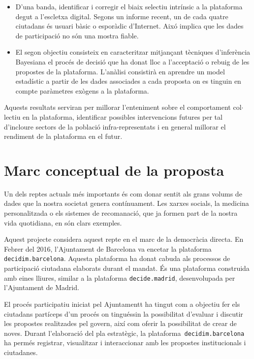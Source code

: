 \documentclass[final,10pt]{article}
\begin{document}
\begin{itemize}
\item
D'una banda, identificar i corregir el biaix selectiu intr\'insic a la plataforma degut a l'escletxa digital. 
Segons un informe recent, un de cada quatre ciutadans \'es usuari b\`asic o espor\`adic d'Internet. 
Aix\'o implica que les dades de participaci\'o no s\'on una mostra fiable.
\item
El segon objectiu consisteix en caracteritzar mitjan\c{c}ant t\`ecniques d'infer\`encia Bayesiana
el proc\'es de decisi\'o que ha donat lloc a l'acceptaci\'o o rebuig de les propostes de la plataforma.
L'an\`alisi consistir\`a en aprendre un model estad\'istic a partir de les dades associades a cada proposta on es tinguin en compte par\`ametres ex\`ogens a la plataforma.
\end{itemize}
Aquests resultats serviran per millorar l'enteniment sobre el comportament col$\cdot$lectiu en la plataforma, identificar possibles intervencions futures per tal d'incloure sectors de la poblaci\'o infra-representats i en general millorar el rendiment de la plataforma en el futur.

\section{Marc conceptual de la proposta}
Un dels reptes actuals m\'es importants \'es com donar sentit als grans volums de dades que la nostra societat genera cont\'inuament.
Les xarxes socials, la medicina personalitzada o els sistemes de recomanaci\'o,%
que ja formen part de la nostra vida quotidiana, en s\'on clars exemples. 

Aquest projecte considera aquest repte en el marc de la democr\`acia directa.
En Febrer del 2016, l'Ajuntament de Barcelona va encetar la plataforma \texttt{decidim.barcelona}.
Aquesta plataforma ha donat cabuda als processos de participaci\'o ciutadana elaborats durant el mandat.
\'Es una plataforma construida amb eines lliures, similar a la plataforma \texttt{decide.madrid}, desenvolupada
per l'Ajuntament de Madrid.

El proc\'es participatiu iniciat pel Ajuntamentt %
ha tingut com a objectiu 
fer els ciutadans part\'iceps d'un proc\'es on tingu\'essin la possibilitat d'evaluar i discutir les propostes realitzades pel govern, aix\'i com oferir la possibilitat de crear de noves.
Durant l'elaboraci\'o del pla estrat\`egic, la plataforma~\texttt{decidim.barcelona} ha perm\'es registrar, visualitzar i interaccionar amb les propostes institucionals i ciutadanes.
\end{document}
